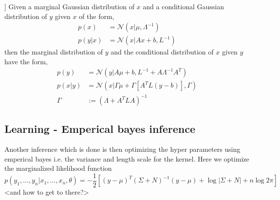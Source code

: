 \begin{testexample2}[Trick with normal distributions [from Bishops book?]]
    Given a marginal Gaussian distribution of $x$ and a conditional Gaussian distribution
    of $y$ given $x$ of the form, 
    \begin{align*}
        p(x) &= \mathcal{N}(x|\mu, \Lambda^{-1})\\
        p(y|x) &= \mathcal{N}(x|Ax+b, L^{-1})
    \end{align*}
    then the marginal distribution of $y$ and the conditional distribution of $x$ given $y$
    have the form, 
    \begin{align}
        p(y) &= \mathcal{N}(y|A\mu+b,L^{-1}+A \Lambda^{-1}A^T) \label{marginal_distribution}\\
        p(x|y) &= \mathcal{N}(x|\Gamma \mu+\Gamma [A^TL(y-b)],\Gamma )\\
        \Gamma &:= (\Lambda +A^TLA)^{-1}
    \end{align}
\end{testexample2}




\subsection{Learning - Emperical bayes inference}


Another inference which is done is then optimizing the hyper parameters using emperical bayes i.e.
the variance and length scale for the kernel. Here we optimize the marginalized likelihood function
$$p(y_1, \dots, y_n|x_1, \dots, x_n, \theta) = -\frac{1}{2}[(y-\mu)^T (\Sigma+N)^{-1}(y-\mu)+ \log |\Sigma+N|+n \log 2\pi]$$
<and how to get to there?>


